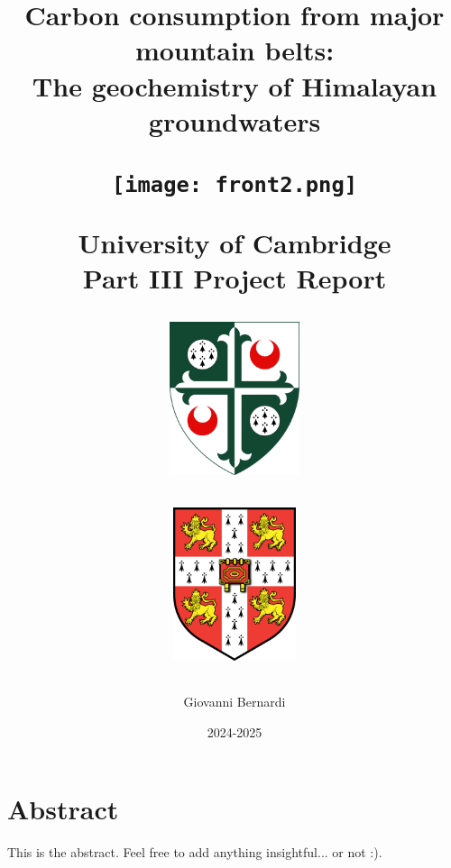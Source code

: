 \documentclass[hidelinks, 12pt]{article} %
\title{
\vspace{-1cm}
\textbf{Carbon consumption from major mountain belts: \\ The geochemistry of Himalayan groundwaters}

\vspace{0.5cm}



\begin{figure}[h]
\texttt{[image: front2.png]}
\centering

\end{figure}


University of Cambridge \\
Part III Project Report \\

\begin{figure}
    \centering
    \begin{subfigure}{.45\textwidth} %
        \centering
        \includegraphics[height=4.5cm]{girton.png} %
        \label{fig:sub1}
    \end{subfigure}%
    \hspace{1.5cm} %
    \begin{subfigure}{.45\textwidth} %
        \centering
        \includegraphics[height=4.5cm]{cambridge.png} %
        \label{fig:sub2}
    \end{subfigure}
    \label{fig:test}
\end{figure}


}
\author{Giovanni Bernardi}
\date{2024-2025} %
\begin{document}
\maketitle




\thispagestyle{empty}

\newpage

\section*{Abstract}
\label{sec:abstract}

This is the abstract. Feel free to add anything insightful... or not :).



\newpage


\thispagestyle{empty}

\tableofcontents

\newpage




\FloatBarrier
{}




















\end{document}

